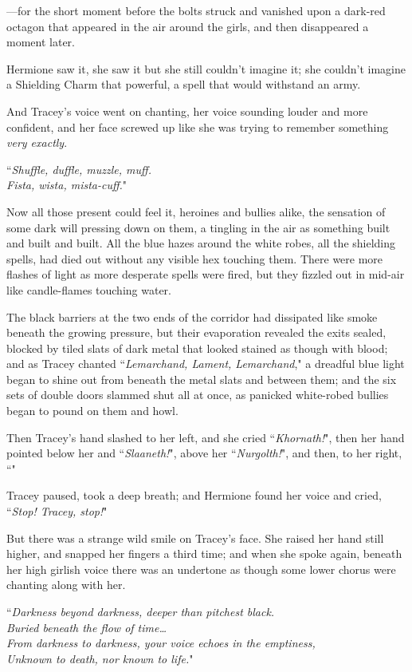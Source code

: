 —for the short moment before the bolts struck and vanished upon a dark-red octagon that appeared in the air around the girls, and then disappeared a moment later.

Hermione saw it, she saw it but she still couldn't imagine it; she couldn't imagine a Shielding Charm that powerful, a spell that would withstand an army.

And Tracey's voice went on chanting, her voice sounding louder and more confident, and her face screwed up like she was trying to remember something \emph{very exactly}.

``\emph{Shuffle, duffle, muzzle, muff.\\
Fista, wista, mista-cuff.}"

Now all those present could feel it, heroines and bullies alike, the sensation of some dark will pressing down on them, a tingling in the air as something built and built and built. All the blue hazes around the white robes, all the shielding spells, had died out without any visible hex touching them. There were more flashes of light as more desperate spells were fired, but they fizzled out in mid-air like candle-flames touching water.

The black barriers at the two ends of the corridor had dissipated like smoke beneath the growing pressure, but their evaporation revealed the exits sealed, blocked by tiled slats of dark metal that looked stained as though with blood; and as Tracey chanted ``\emph{Lemarchand, Lament, Lemarchand}," a dreadful blue light began to shine out from beneath the metal slats and between them; and the six sets of double doors slammed shut all at once, as panicked white-robed bullies began to pound on them and howl.

Then Tracey's hand slashed to her left, and she cried ``\emph{Khornath!}", then her hand pointed below her and ``\emph{Slaaneth!}", above her ``\emph{Nurgolth!}", and then, to her right, ``"

Tracey paused, took a deep breath; and Hermione found her voice and cried, ``\emph{Stop! Tracey, stop!}"

But there was a strange wild smile on Tracey's face. She raised her hand still higher, and snapped her fingers a third time; and when she spoke again, beneath her high girlish voice there was an undertone as though some lower chorus were chanting along with her.

``\emph{Darkness beyond darkness, deeper than pitchest black.\\
Buried beneath the flow of time{\ldots}\\
From darkness to darkness, your voice echoes in the emptiness,\\
Unknown to death, nor known to life.}"

